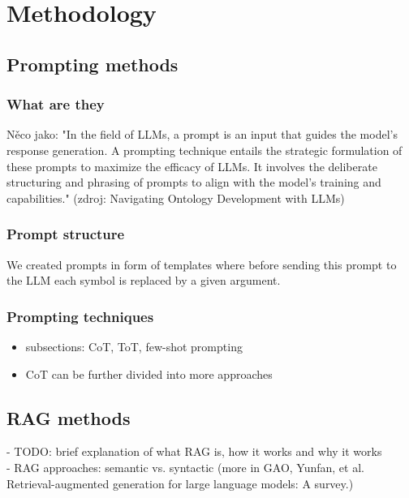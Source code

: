 \chapter{Methodology}


\section{Prompting methods}

\subsection{What are they}

Něco jako: "In the field of LLMs, a prompt is an input that guides the model’s response
 generation. A prompting technique entails the strategic formulation of these
 prompts to maximize the efficacy of LLMs. It involves the deliberate structuring
 and phrasing of prompts to align with the model’s training and capabilities." (zdroj: Navigating Ontology Development with LLMs)

\subsection{Prompt structure}

We created prompts in form of templates where before sending this prompt to the LLM each symbol is replaced by a given argument.


\subsection{Prompting techniques}
\begin{itemize}
\item subsections: CoT, ToT, few-shot prompting \\
\item CoT can be further divided into more approaches
\end{itemize}



\section{RAG methods}
- TODO: brief explanation of what RAG is, how it works and why it works \\
- RAG approaches: semantic vs. syntactic (more in GAO, Yunfan, et al. Retrieval-augmented generation for large language models: A survey.) \\